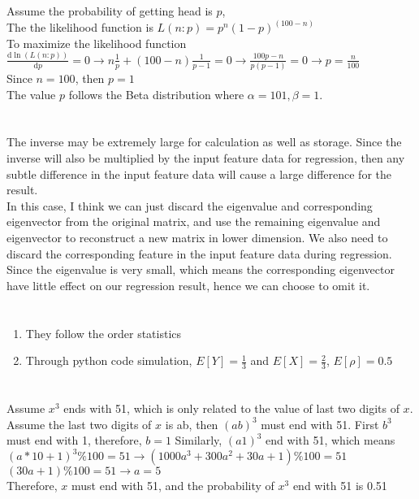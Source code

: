 \documentclass[10pt,a4paper]{article}
\begin{document}
\section{}
    \noindent Assume the probability of getting head is $p$,
    \\The the likelihood function is $L(n:p)=p^{n}(1-p)^{(100-n)}$ 
    \\To maximize the likelihood function $\frac{\mathrm{d}\ln(L(n:p))}{\mathrm{d}p}=0\rightarrow n\frac{1}{p}+(100-n)\frac{1}{p-1}=0\rightarrow\frac{100p-n}{p(p-1)}=0\rightarrow p=\frac{n}{100}$
    \\Since $n=100$, then $p=1$
    \\The value $p$ follows the Beta distribution where $\alpha=101,\beta=1$.
\section{}
    \noindent The inverse may be extremely large for calculation as well as storage. Since the inverse will also be multiplied by the input feature data for regression, then any subtle difference in the input feature data will cause a large difference for the result.
    \\In this case, I think we can just discard the eigenvalue and corresponding eigenvector from the original matrix, and use the remaining eigenvalue and eigenvector to reconstruct a new matrix in lower dimension. We also need to discard the corresponding feature in the input feature data during regression.
    \\Since the eigenvalue is very small, which means the corresponding eigenvector have little effect on our regression result, hence we can choose to omit it.
\section{}
    \begin{enumerate}[a]
        \item They follow the order statistics
        \item Through python code simulation, $E[Y]=\frac{1}{3}$ and $E[X]=\frac{2}{3}$, $E[\rho]=0.5$
    \end{enumerate}
\section{}
    Assume $x^3$ ends with 51, which is only related to the value of last two digits of $x$. Assume the last two digits of $x$ is ab, then $(ab)^3$ must end with 51. First $b^3$ must end with 1, therefore, $b=1$
    Similarly, $(a1)^3$ end with 51, which means $(a*10+1)^3\%100=51\rightarrow (1000a^3+300a^2+30a+1)\%100=51$
    \\$(30a+1)\%100=51\rightarrow a=5$ 
    \\Therefore, $x$ must end with 51, and the probability of $x^3$ end with 51 is 0.51
\end{document}
